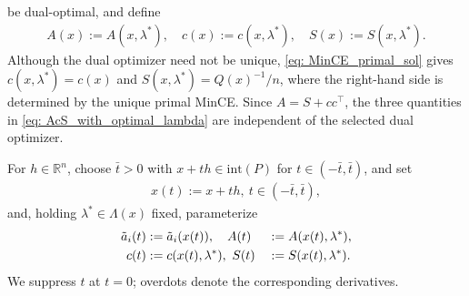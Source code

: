 \documentclass[smallextended]{svjour3}
\newcommand{\R}{\mathbb{R}}
\begin{document}
be dual-optimal, and define
\begin{align}\label{eq: AcS_with_optimal_lambda}
        A(x) := A(x, \lambda^*), \quad
        c(x) := c(x, \lambda^*), \quad
        S(x) := S(x, \lambda^*).
\end{align}
Although the dual optimizer need not be unique,
\eqref{eq: MinCE_primal_sol} gives
$c(x,\lambda^*)=c(x)$ and $S(x,\lambda^*)=Q(x)^{-1}/n$, where the right-hand
side is determined by the unique primal MinCE. Since
$A=S+cc^\top$, the three quantities in \eqref{eq: AcS_with_optimal_lambda}
are independent of the selected dual optimizer.

For $h\in\R^n$, choose $\bar t>0$ with
$x+th\in\mathrm{int}(P)$ for $t\in(-\bar t,\bar t)$, and set
\begin{align}\label{eq: x_along_h}
    x(t) := x + th,~ t\in(-\bar t,\bar t),
\end{align}
and, holding $\lambda^*\in\Lambda(x)$ fixed, parameterize
\begin{alignat}{2}\label{eq: parameterization_in_t}
     \tilde{a}_i(t) & :=  \tilde{a}_i(x(t)),\quad 
    A(t) && :=  A(x(t), \lambda^*), \notag \\ 
     c(t) &:=  c(x(t), \lambda^*),~
    S(t) && :=  S(x(t), \lambda^*).
\end{alignat}
We suppress $t$ at $t=0$; overdots denote the corresponding derivatives.
\end{document}
